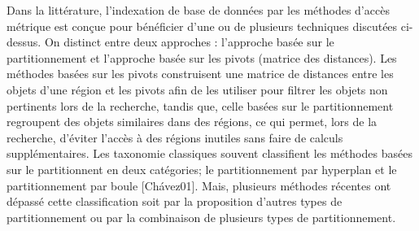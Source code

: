 Dans la littérature, l’indexation de base de données par les méthodes d’accès métrique est conçue pour bénéficier d’une ou de plusieurs techniques discutées ci-dessus. On distinct entre deux approches : l’approche basée sur le partitionnement et l’approche basée sur les pivots (matrice des distances). Les méthodes basées sur les pivots construisent une matrice de distances entre les objets d’une région et les pivots afin de les utiliser pour filtrer les objets non pertinents lors de la recherche, tandis que, celle basées sur le partitionnement regroupent des objets similaires dans des régions, ce qui permet, lors de la recherche, d’éviter l’accès à des régions inutiles sans faire de calculs supplémentaires. Les taxonomie classiques souvent classifient les méthodes basées sur le partitionnent en deux catégories; le partitionnement par hyperplan et le partitionnement par boule [Chávez01]. Mais, plusieurs méthodes récentes ont dépassé cette classification soit par la proposition d’autres types de partitionnement ou par la combinaison de plusieurs types de partitionnement. \\

